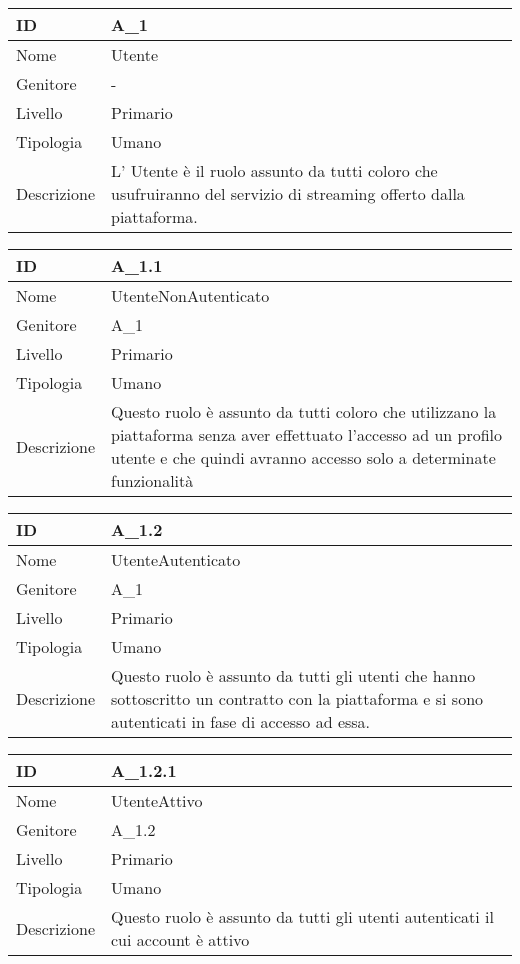 \begin{center}

\begin{tabular}{ |p{2cm}|p{10cm}|  }
\hline
ID & A\_1 \\\hline
Nome & Utente\\\hline
Genitore & - \\\hline
Livello &  Primario \\\hline
Tipologia & Umano \\\hline
Descrizione &  L' Utente è il ruolo assunto da tutti coloro che usufruiranno del servizio di streaming offerto dalla piattaforma. \\\hline
\end{tabular}
\label{table_attore:1}\newline

\begin{tabular}{ |p{2cm}|p{10cm}|  }
\hline
ID & A\_1.1 \\\hline
Nome & UtenteNonAutenticato\\\hline
Genitore & A\_1 \\\hline
Livello &  Primario \\\hline
Tipologia & Umano \\\hline
Descrizione &  Questo ruolo è assunto da tutti coloro che utilizzano la piattaforma senza aver effettuato l'accesso ad un profilo utente e che quindi avranno accesso solo a determinate funzionalità \\\hline
\end{tabular}
\label{table_attore:1.1}\newline

\begin{tabular}{ |p{2cm}|p{10cm}|  }
\hline
ID & A\_1.2 \\\hline
Nome & UtenteAutenticato\\\hline
Genitore & A\_1 \\\hline
Livello &  Primario \\\hline
Tipologia & Umano \\\hline
Descrizione &  Questo ruolo è assunto da tutti gli utenti che hanno sottoscritto un contratto con la piattaforma e si sono autenticati in fase di accesso ad essa. \\\hline
\end{tabular}
\label{table_attore:1.2}\newline

\begin{tabular}{ |p{2cm}|p{10cm}|  }
\hline
ID & A\_1.2.1 \\\hline
Nome & UtenteAttivo\\\hline
Genitore & A\_1.2 \\\hline
Livello &  Primario \\\hline
Tipologia & Umano \\\hline
Descrizione &  Questo ruolo è assunto da tutti gli utenti autenticati il cui account è attivo \\\hline
\end{tabular}
\label{table_attore:1.2.1}\newline


\end{center}
